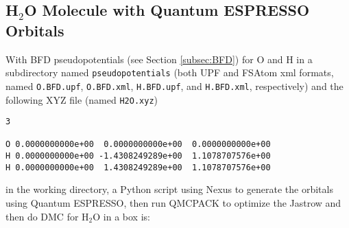 \subsection{H$_2$O Molecule with Quantum ESPRESSO Orbitals}
With BFD pseudopotentials (see Section \ref{subsec:BFD}) for O and H in a subdirectory named \texttt{pseudopotentials} (both UPF and FSAtom xml formats, named \texttt{O.BFD.upf}, \texttt{O.BFD.xml}, \texttt{H.BFD.upf}, and \texttt{H.BFD.xml}, respectively) and the following XYZ file (named \texttt{H2O.xyz})
\begin{lstlisting}
3

O 0.0000000000e+00  0.0000000000e+00  0.0000000000e+00
H 0.0000000000e+00 -1.4308249289e+00  1.1078707576e+00
H 0.0000000000e+00  1.4308249289e+00  1.1078707576e+00
\end{lstlisting}
in the working directory, a Python script using Nexus to generate the orbitals using Quantum ESPRESSO, then run QMCPACK to optimize the Jastrow and then do DMC for H$_2$O in a box is:
